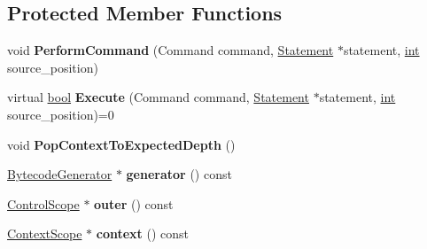 \subsection*{Protected Member Functions}
\begin{DoxyCompactItemize}
\item 
\mbox{\label{classv8_1_1internal_1_1interpreter_1_1BytecodeGenerator_1_1ControlScope_a0433a9ed04a952359da575ad2193a34a}} 
void {\bfseries Perform\+Command} (Command command, \mbox{\hyperlink{classv8_1_1internal_1_1Statement}{Statement}} $\ast$statement, \mbox{\hyperlink{classint}{int}} source\+\_\+position)
\item 
\mbox{\label{classv8_1_1internal_1_1interpreter_1_1BytecodeGenerator_1_1ControlScope_a5eb468f354441d849f9cf755119260c7}} 
virtual \mbox{\hyperlink{classbool}{bool}} {\bfseries Execute} (Command command, \mbox{\hyperlink{classv8_1_1internal_1_1Statement}{Statement}} $\ast$statement, \mbox{\hyperlink{classint}{int}} source\+\_\+position)=0
\item 
\mbox{\label{classv8_1_1internal_1_1interpreter_1_1BytecodeGenerator_1_1ControlScope_a7afc61ec6d0e5012e7aba2e4b6abc321}} 
void {\bfseries Pop\+Context\+To\+Expected\+Depth} ()
\item 
\mbox{\label{classv8_1_1internal_1_1interpreter_1_1BytecodeGenerator_1_1ControlScope_aaebb2bc38d031b745e8e1922ddbd7fd6}} 
\mbox{\hyperlink{classv8_1_1internal_1_1interpreter_1_1BytecodeGenerator}{Bytecode\+Generator}} $\ast$ {\bfseries generator} () const
\item 
\mbox{\label{classv8_1_1internal_1_1interpreter_1_1BytecodeGenerator_1_1ControlScope_a6741ae732c89eb2e838bc90d25073ce7}} 
\mbox{\hyperlink{classv8_1_1internal_1_1interpreter_1_1BytecodeGenerator_1_1ControlScope}{Control\+Scope}} $\ast$ {\bfseries outer} () const
\item 
\mbox{\label{classv8_1_1internal_1_1interpreter_1_1BytecodeGenerator_1_1ControlScope_a390d42f8dd15223563f453f6d8ac362b}} 
\mbox{\hyperlink{classv8_1_1internal_1_1interpreter_1_1BytecodeGenerator_1_1ContextScope}{Context\+Scope}} $\ast$ {\bfseries context} () const
\end{DoxyCompactItemize}
